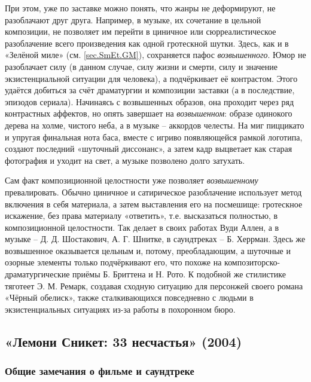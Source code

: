 При этом, уже по заставке можно понять, что жанры не деформируют, не разоблачают друг друга.
Например, в музыке, их сочетание в цельной композиции, не позволяет им перейти в циничное или сюрреалистическое разоблачение всего произведения как одной гротескной шутки.
Здесь, как и в «Зелёной миле» (см. \ref{sec.SmEt.GM}), сохраняется пафос \emph{возвышенного}.
Юмор не разоблачает силу (в данном случае, силу жизни и смерти, силу и значение экзистенциальной ситуации для человека), а подчёркивает её контрастом.
Этого удаётся добиться за счёт драматургии и композиции заставки (а в последствие, эпизодов сериала).
Начинаясь с возвышенных образов, она проходит через ряд контрастных аффектов, но опять завершает на \emph{возвышенном}: образе одинокого дерева на холме, чистого неба, а в музыке -- аккордов челесты.
На миг пиццикато и упругая финальная нота баса, вместе с игриво появляющейся рамкой логотипа, создают последний «шуточный диссонанс», а затем кадр выцветает как старая фотография и уходит на свет, а музыке позволено долго затухать.

Сам факт композиционной целостности уже позволяет \emph{возвышенному} превалировать.
Обычно циничное и сатирическое разоблачение использует метод включения в себя материала, а затем выставления его на посмешище: гротескное искажение, без права материалу «ответить», т.е. высказаться полностью, в композиционной целостности.
Так делает в своих работах Вуди Аллен, а в музыке -- Д. Д. Шостакович, А. Г. Шнитке, в саундтреках -- Б. Херрман.
Здесь же возвышенное оказывается цельным и, потому, преобладающим, а шуточные и озорные элементы только подчёркивают его, что похоже на композиторско-драматургические приёмы Б. Бриттена и Н. Рото.
К подобной же стилистике тяготеет Э. М. Ремарк, создавая сходную ситуацию для персонжей своего романа «Чёрный обелиск», также сталкивающихся повседневно с людьми в экзистенциальных ситуациях из-за работы в похоронном бюро.

\subsection{«Лемони Сникет: 33 несчастья» (2004)}\label{sec.SmEt.JB}

\subsubsection{Общие замечания о фильме и саундтреке}\label{ux43eux431ux449ux438ux435-ux437ux430ux43cux435ux447ux430ux43dux438ux44f-ux43e-ux444ux438ux43bux44cux43cux435-ux438-ux441ux430ux443ux43dux434ux442ux440ux435ux43aux435}

